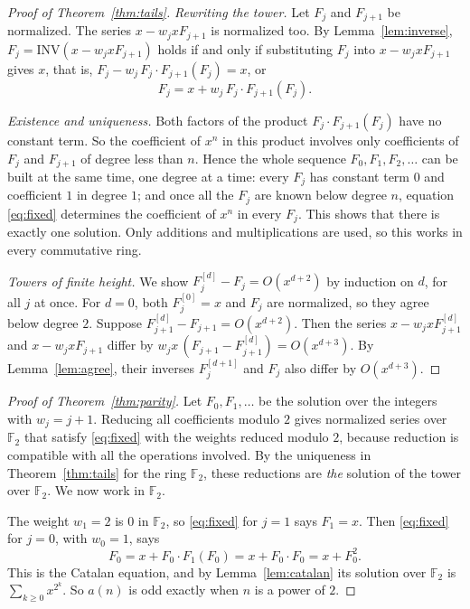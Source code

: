 \documentclass[11pt,a4paper]{article}
\theoremstyle{definition}
\theoremstyle{remark}
\newcommand{\F}{\mathbb{F}}
\begin{document}
\begin{proof}[Proof of Theorem~\ref{thm:tails}]
\emph{Rewriting the tower.} Let $F_j$ and $F_{j+1}$ be normalized. The series $x-w_jxF_{j+1}$ is normalized too. By
Lemma~\ref{lem:inverse}, $F_j=\mathrm{INV}(x-w_jxF_{j+1})$ holds if and only if substituting $F_j$ into
$x-w_jxF_{j+1}$ gives $x$, that is, $F_j-w_j\,F_j\cdot F_{j+1}(F_j)=x$, or
\begin{equation}\label{eq:fixed}
F_j=x+w_j\,F_j\cdot F_{j+1}(F_j).
\end{equation}

\emph{Existence and uniqueness.} Both factors of the product $F_j\cdot F_{j+1}(F_j)$ have no constant term. So the
coefficient of $x^n$ in this product involves only coefficients of $F_j$ and $F_{j+1}$ of degree less than $n$. Hence
the whole sequence $F_0,F_1,F_2,\dots$ can be built at the same time, one degree at a time: every $F_j$ has constant term
$0$ and coefficient $1$ in degree $1$; and once all the $F_j$ are known below degree $n$, equation \eqref{eq:fixed}
determines the coefficient of $x^n$ in every $F_j$. This shows that there is exactly one solution. Only additions and
multiplications are used, so this works in every commutative ring.

\emph{Towers of finite height.} We show $F^{[d]}_j-F_j=O(x^{d+2})$ by induction on $d$, for all $j$ at once. For $d=0$,
both $F^{[0]}_j=x$ and $F_j$ are normalized, so they agree below degree $2$. Suppose $F^{[d]}_{j+1}-F_{j+1}=O(x^{d+2})$.
Then the series $x-w_jxF^{[d]}_{j+1}$ and $x-w_jxF_{j+1}$ differ by $w_jx\,(F_{j+1}-F^{[d]}_{j+1})=O(x^{d+3})$. By
Lemma~\ref{lem:agree}, their inverses $F^{[d+1]}_j$ and $F_j$ also differ by $O(x^{d+3})$.
\end{proof}

\begin{proof}[Proof of Theorem~\ref{thm:parity}]
Let $F_0,F_1,\dots$ be the solution over the integers with $w_j=j+1$. Reducing all coefficients modulo $2$ gives
normalized series over $\F_2$ that satisfy \eqref{eq:fixed} with the weights reduced modulo $2$, because reduction is
compatible with all the operations involved. By the uniqueness in Theorem~\ref{thm:tails} for the ring $\F_2$, these
reductions are \emph{the} solution of the tower over $\F_2$. We now work in $\F_2$.

The weight $w_1=2$ is $0$ in $\F_2$, so \eqref{eq:fixed} for $j=1$ says $F_1=x$. Then \eqref{eq:fixed} for $j=0$,
with $w_0=1$, says
\[
F_0=x+F_0\cdot F_1(F_0)=x+F_0\cdot F_0=x+F_0^2 .
\]
This is the Catalan equation, and by Lemma~\ref{lem:catalan} its solution over $\F_2$ is $\sum_{k\ge0}x^{2^k}$. So
$a(n)$ is odd exactly when $n$ is a power of $2$.
\end{proof}
\end{document}
